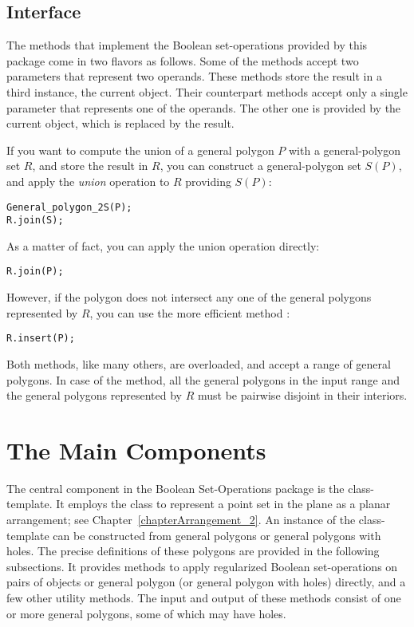 \subsection{Interface}
\label{bobs_ssec:interface}
The methods that implement the Boolean set-operations provided by this
package come in two flavors as follows. Some of the methods accept two
parameters that represent two operands. These methods store the result
in a third instance, the current object. Their counterpart methods
accept only a single parameter that represents one of the operands.
The other one is provided by the current object, which is replaced by
the result.

If you want to compute the union of a general polygon $P$ with a
general-polygon set $R$, and store the result in $R$, you can construct
a general-polygon set $S(P)$, and apply the {\em union} operation to
$R$ providing $S(P)$:

\begin{alltt}
General_polygon_2 S(P);
R.join(S);
\end{alltt}

As a matter of fact, you can apply the union operation directly:

\begin{alltt}
R.join(P);
\end{alltt}

However, if the polygon does not intersect any one of the general
polygons represented by $R$, you can use the more efficient method
:

\begin{alltt}
R.insert(P);
\end{alltt}

Both methods, like many others, are overloaded, and accept a range of
general polygons. In case of the  method, all the general
polygons in the input range and the general polygons represented by
$R$ must be pairwise disjoint in their interiors.

\section{The Main Components}
\label{bobs_sec:main_components}
The central component in the Boolean Set-Operations package is the
 class-template. It employs the
 class to represent a point set in the plane as a
planar arrangement; see Chapter~\ref{chapterArrangement_2}. 
An instance of the  class-template can be
constructed from general polygons or general polygons with holes. The
precise definitions of these polygons are provided in the following
subsections. It provides methods to apply regularized Boolean 
set-operations on pairs of  objects or general
polygon (or general polygon with holes) directly, and a few other utility
methods. The input and output of these methods consist of one or more
general polygons, some of which may have holes.

